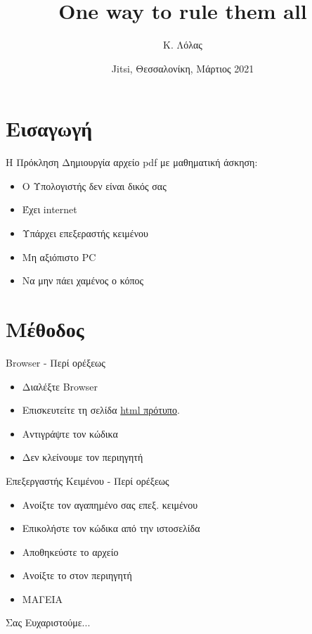 \documentclass[greek]{beamer}
\title{One way to rule them all}
\author[Λόλας]{Κ. Λόλας\inst{1}}
\institute[]
{
  \inst{1}%
  10ο ΓΕΛ ΘΕΣ/ΝΙΚΗΣ (ΠΕ03)
}
\date{Jitsi, Θεσσαλονίκη, Μάρτιος 2021}
\begin{document}
\begin{frame}
  \titlepage
\end{frame}

\section{Εισαγωγή}
\begin{frame}{Η Πρόκληση}
  Δημιουργία αρχείο pdf με μαθηματική άσκηση:
  \begin{itemize}
    \item Ο Υπολογιστής δεν είναι δικός σας
    \item Έχει internet
    \item Υπάρχει επεξεραστής κειμένου
    \item Μη αξιόπιστο PC
    \item Να μην πάει χαμένος ο κόπος
  \end{itemize}
\end{frame}

\section{Μέθοδος}
\begin{frame}{Browser - Περί ορέξεως}
  \begin{itemize}
    \item Διαλέξτε Browser
    \item Επισκευτείτε τη σελίδα \href{github.com/costasdroid/lectures/PiDay2021/maths.html}{html πρότυπο}.
    \item Αντιγράψτε τον κώδικα
    \item Δεν κλείνουμε τον περιηγητή
  \end{itemize}
\end{frame}

\begin{frame}{Επεξεργαστής Κειμένου - Περί ορέξεως}
  \begin{itemize}
    \item Ανοίξτε τον αγαπημένο σας επεξ. κειμένου
    \item Επικολήστε τον κώδικα από την ιστοσελίδα
    \item Αποθηκεύστε το αρχείο
    \item Ανοίξτε το στον περιηγητή
    \item ΜΑΓΕΙΑ
  \end{itemize}
\end{frame}


\begin{frame}[plain,c]
  \begin{center}
    \Huge Σας Ευχαριστούμε...
  \end{center}
\end{frame}
\end{document}
